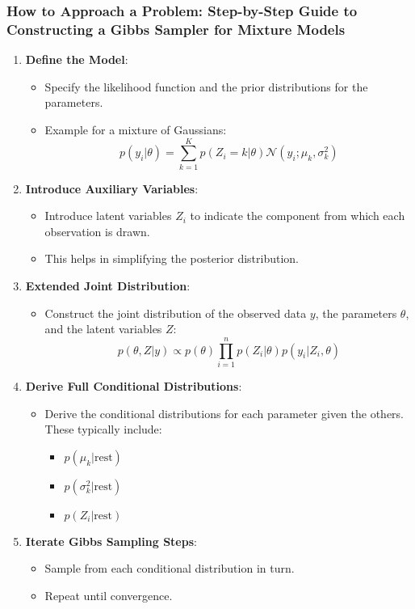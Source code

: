 \documentclass{article}
\begin{document}
\subsubsection*{How to Approach a Problem: Step-by-Step Guide to Constructing a Gibbs Sampler for Mixture Models}
\begin{enumerate}
    \item \textbf{Define the Model}:
    \begin{itemize}
        \item Specify the likelihood function and the prior distributions for the parameters.
        \item Example for a mixture of Gaussians: 
        \[
        p(y_i | \theta) = \sum_{k=1}^K p(Z_i = k | \theta) \mathcal{N}(y_i; \mu_k, \sigma_k^2)
        \]
    \end{itemize}
    
    \item \textbf{Introduce Auxiliary Variables}:
    \begin{itemize}
        \item Introduce latent variables \(Z_i\) to indicate the component from which each observation is drawn.
        \item This helps in simplifying the posterior distribution.
    \end{itemize}
    
    \item \textbf{Extended Joint Distribution}:
    \begin{itemize}
        \item Construct the joint distribution of the observed data \(y\), the parameters \(\theta\), and the latent variables \(Z\):
        \[
        p(\theta, Z | y) \propto p(\theta) \prod_{i=1}^n p(Z_i | \theta) p(y_i | Z_i, \theta)
        \]
    \end{itemize}
    
    \item \textbf{Derive Full Conditional Distributions}:
    \begin{itemize}
        \item Derive the conditional distributions for each parameter given the others. These typically include:
        \begin{itemize}
            \item \( p(\mu_k | \text{rest}) \)
            \item \( p(\sigma_k^2 | \text{rest}) \)
            \item \( p(Z_i | \text{rest}) \)
        \end{itemize}
    \end{itemize}
    
    \item \textbf{Iterate Gibbs Sampling Steps}:
    \begin{itemize}
        \item Sample from each conditional distribution in turn.
        \item Repeat until convergence.
    \end{itemize}
\end{enumerate}
\end{document}
